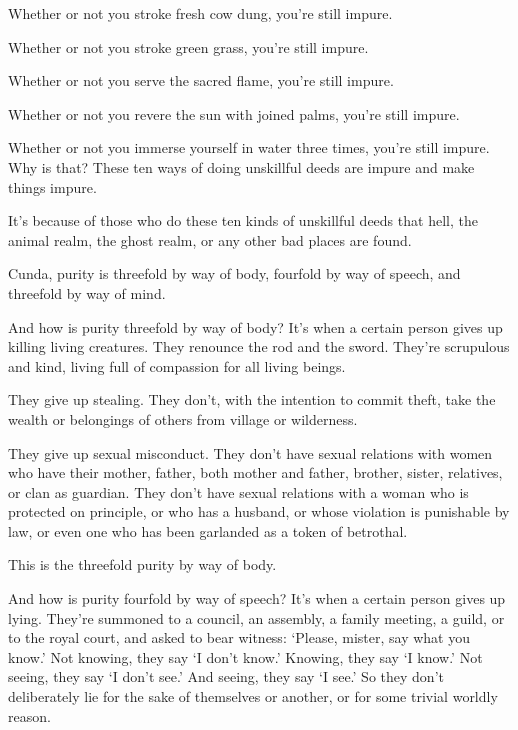 \documentclass[12pt,openany]{book}%
\begin{document}
Whether or not you stroke fresh cow dung, you’re still impure. 

Whether or not you stroke green grass, you’re still impure. 

Whether or not you serve the sacred flame, you’re still impure. 

Whether or not you revere the sun with joined palms, you’re still impure. 

Whether or not you immerse yourself in water three times, you’re still impure. Why is that? These ten ways of doing unskillful deeds are impure and make things impure. 

It’s because of those who do these ten kinds of unskillful deeds that hell, the animal realm, the ghost realm, or any other bad places are found. 

Cunda, purity is threefold by way of body, fourfold by way of speech, and threefold by way of mind. 

And how is purity threefold by way of body? It’s when a certain person gives up killing living creatures. They renounce the rod and the sword. They’re scrupulous and kind, living full of compassion for all living beings. 

They give up stealing. They don’t, with the intention to commit theft, take the wealth or belongings of others from village or wilderness. 

They give up sexual misconduct. They don’t have sexual relations with women who have their mother, father, both mother and father, brother, sister, relatives, or clan as guardian. They don’t have sexual relations with a woman who is protected on principle, or who has a husband, or whose violation is punishable by law, or even one who has been garlanded as a token of betrothal. 

This is the threefold purity by way of body. 

And how is purity fourfold by way of speech? It’s when a certain person gives up lying. They’re summoned to a council, an assembly, a family meeting, a guild, or to the royal court, and asked to bear witness: ‘Please, mister, say what you know.’ Not knowing, they say ‘I don’t know.’ Knowing, they say ‘I know.’ Not seeing, they say ‘I don’t see.’ And seeing, they say ‘I see.’ So they don’t deliberately lie for the sake of themselves or another, or for some trivial worldly reason. 
\end{document}
